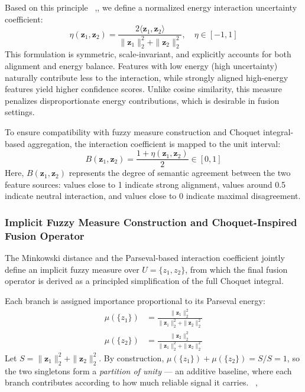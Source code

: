 \documentclass[preprint,12pt]{elsarticle}
\begin{document}
Based on this principle ~\cite{b12},\cite{b13}, we define a normalized energy interaction uncertainty coefficient:
\begin{equation*}
    \eta(\mathbf{z}_1, \mathbf{z}_2) = \frac{2\langle \mathbf{z}_1, \mathbf{z}_2 \rangle}{\|\mathbf{z}_1\|_2^2 + \|\mathbf{z}_2\|_2^2}, \quad \eta \in [-1, 1]
    \label{eq:eta}
\end{equation*}
This formulation is symmetric, scale-invariant, and explicitly accounts for both alignment and energy balance. Features with low energy (high uncertainty) naturally contribute less to the interaction, while strongly aligned high-energy features yield higher confidence scores. Unlike cosine similarity, this measure penalizes disproportionate energy contributions, which is desirable in fusion settings.

To ensure compatibility with fuzzy measure construction and Choquet integral-based aggregation, the interaction coefficient is mapped to the unit interval:
\begin{equation*}
    B(\mathbf{z}_1, \mathbf{z}_2) = \frac{1 + \eta(\mathbf{z}_1, \mathbf{z}_2)}{2} \in [0, 1]
    \label{eq:alignment}
\end{equation*}
Here, $B(\mathbf{z}_1, \mathbf{z}_2)$ represents the degree of semantic agreement between the two feature sources: values close to 1 indicate strong alignment, values around 0.5 indicate neutral interaction, and values close to 0 indicate maximal disagreement.

\subsubsection{Implicit Fuzzy Measure Construction and Choquet-Inspired Fusion Operator}

The Minkowski distance and the Parseval-based interaction coefficient jointly define an implicit fuzzy measure over $U = \{z_1, z_2\}$, from which the final fusion operator is derived as a principled simplification of the full Choquet integral.

Each branch is assigned importance proportional to its Parseval energy:
\begin{align*}
    \mu(\{z_1\}) &= \frac{\|\mathbf{z}_1\|_2^2}{\|\mathbf{z}_1\|_2^2 + \|\mathbf{z}_2\|_2^2} \\[6pt]
    \mu(\{z_2\}) &= \frac{\|\mathbf{z}_2\|_2^2}{\|\mathbf{z}_1\|_2^2 + \|\mathbf{z}_2\|_2^2}
\end{align*}
Let $S = \|\mathbf{z}_1\|_2^2 + \|\mathbf{z}_2\|_2^2$. By construction, $\mu(\{z_1\}) + \mu(\{z_2\}) = S/S = 1$, so the two singletons form a \emph{partition of unity} — an additive baseline, where each branch contributes according to how much reliable signal it carries. ~\cite{b15},~\cite{b14}
\end{document}
